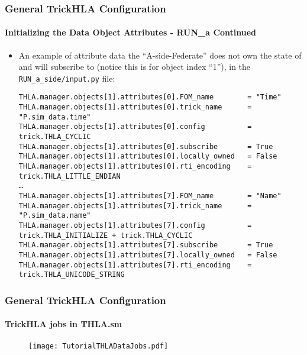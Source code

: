    \begin{frame}[fragile]
      \frametitle{General TrickHLA Configuration}
      \framesubtitle{Initializing the Data Object Attributes - RUN\_a Continued}
      \begin{itemize}
         \item An example of attribute data the “A-side-Federate” does not own
         the state of and will subscribe to (notice this is for object index “1”),
         in the \texttt{RUN\_a\_side/input.py} file:
\begin{Verbatim}[frame=single, fontsize=\tiny]
THLA.manager.objects[1].attributes[0].FOM_name        = "Time"
THLA.manager.objects[1].attributes[0].trick_name      = "P.sim_data.time"
THLA.manager.objects[1].attributes[0].config          = trick.THLA_CYCLIC
THLA.manager.objects[1].attributes[0].subscribe       = True
THLA.manager.objects[1].attributes[0].locally_owned   = False
THLA.manager.objects[1].attributes[0].rti_encoding    = trick.THLA_LITTLE_ENDIAN
…
THLA.manager.objects[1].attributes[7].FOM_name        = "Name"
THLA.manager.objects[1].attributes[7].trick_name      = "P.sim_data.name"
THLA.manager.objects[1].attributes[7].config          = trick.THLA_INITIALIZE + trick.THLA_CYCLIC
THLA.manager.objects[1].attributes[7].subscribe       = True
THLA.manager.objects[1].attributes[7].locally_owned   = False
THLA.manager.objects[1].attributes[7].rti_encoding    = trick.THLA_UNICODE_STRING
\end{Verbatim}
      \end{itemize}
   \end{frame}
   
   
   \begin{frame}
      \frametitle{General TrickHLA Configuration}
      \framesubtitle{TrickHLA jobs in THLA.sm}
      \begin{figure}
      \texttt{[image: TutorialTHLADataJobs.pdf]}
      \end{figure}
   \end{frame}